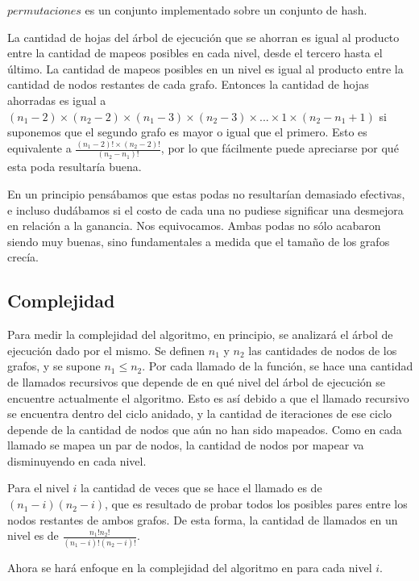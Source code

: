 $permutaciones$ es un conjunto implementado sobre un conjunto de hash.

La cantidad de hojas del árbol de ejecución que se ahorran es igual al
producto entre la cantidad de mapeos posibles en cada nivel, desde el tercero
hasta el último. La cantidad de mapeos posibles en un nivel es igual al
producto entre la cantidad de nodos restantes de cada grafo. Entonces la
cantidad de hojas ahorradas es igual a $(n_1 - 2) \times (n_2 - 2) \times
(n_1 - 3) \times (n_2 - 3) \times ... \times 1 \times (n_2 - n_1 + 1)$ si
suponemos que el segundo grafo es mayor o igual que el primero. Esto es
equivalente a $\frac{(n_1 - 2)! \times (n_2 - 2)!}{(n_2 - n_1)!}$, por lo que
fácilmente puede apreciarse por qué esta poda resultaría buena.

En un principio pensábamos que estas podas no resultarían demasiado efectivas,
e incluso dudábamos si el costo de cada una no pudiese significar una
desmejora en relación a la ganancia. Nos equivocamos. Ambas podas no sólo
acabaron siendo muy buenas, sino fundamentales a medida que el tamaño de los
grafos crecía.

\subsection{Complejidad}

Para medir la complejidad del algoritmo, en principio, se analizará el
árbol de ejecución dado por el mismo. Se definen $n_1$ y $n_2$ las cantidades
de nodos de los grafos, y se supone $n_1 \leq n_2$. Por cada llamado de
la función, se hace una cantidad de llamados recursivos que depende de en qué
nivel del árbol de ejecución se encuentre actualmente el algoritmo. Esto es
así debido a que el llamado recursivo se encuentra dentro del ciclo anidado,
y la cantidad de iteraciones de ese ciclo depende de la cantidad de nodos que
aún no han sido mapeados. Como en cada llamado se mapea un par de nodos, la
cantidad de nodos por mapear va disminuyendo en cada nivel.

Para el nivel $i$ la cantidad de veces que se hace el llamado es de
$(n_1 - i)  (n_2 - i)$, que es resultado de probar todos los posibles
pares entre los nodos restantes de ambos grafos. De esta forma, la cantidad de
llamados en un nivel es de
$\frac{n_1!  n_2!}{(n_1 - i)!  (n_2 - i)!}$.

Ahora se hará enfoque en la complejidad del algoritmo en para cada nivel $i$.

